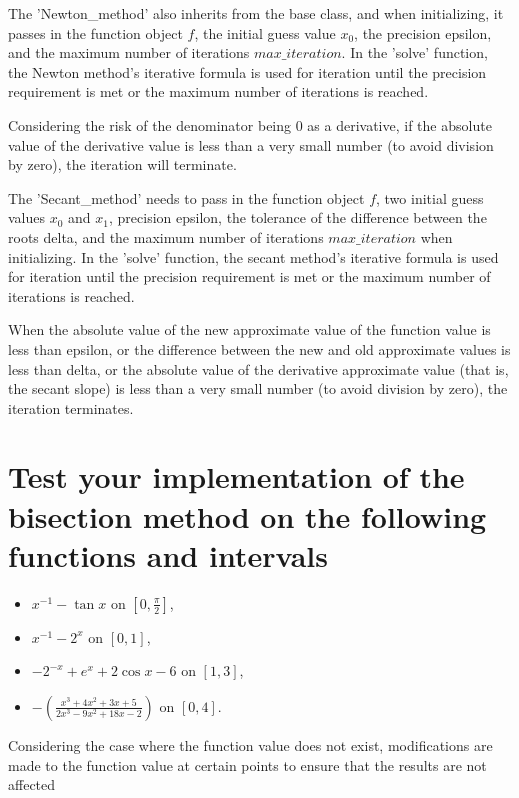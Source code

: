 \documentclass[a4paper]{article}
\begin{document}
The 'Newton\_method' also inherits from the base class, and when initializing, it passes in the function object \(f\), the initial guess value \(x_0\), the precision epsilon, and the maximum number of iterations \(max\_iteration\). In the 'solve' function, the Newton method's iterative formula is used for iteration until the precision requirement is met or the maximum number of iterations is reached.

Considering the risk of the denominator being 0 as a derivative, if the absolute value of the derivative value is less than a very small number (to avoid division by zero), the iteration will terminate.

The 'Secant\_method' needs to pass in the function object \(f\), two initial guess values \(x_0\) and \(x_1\), precision epsilon, the tolerance of the difference between the roots delta, and the maximum number of iterations \(max\_iteration\) when initializing. In the 'solve' function, the secant method's iterative formula is used for iteration until the precision requirement is met or the maximum number of iterations is reached.

When the absolute value of the new approximate value of the function value is less than epsilon, or the difference between the new and old approximate values is less than delta, or the absolute value of the derivative approximate value (that is, the secant slope) is less than a very small number (to avoid division by zero), the iteration terminates.

\section*{ Test your implementation of the bisection method on the
following functions and intervals}

\begin{itemize}
  \item $x^{-1} - \tan x$ on $\left[0, \frac{\pi}{2}\right]$,
  \item $x^{-1} - 2^x$ on $[0,1]$,
  \item $-2^{-x} + e^x + 2\cos x - 6$ on $[1,3]$,
  \item $-\left(\frac{x^{3} + 4 x^{2} + 3 x + 5}{2 x^{3} - 9 x^{2} + 18 x - 2}\right)$ on $[0,4]$.
\end{itemize}
Considering the case where the function value does not exist, modifications are made to the function value at certain points to ensure that the results are not affected\\
\end{document}
